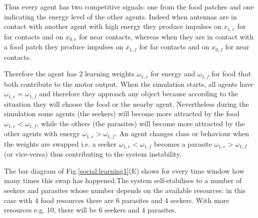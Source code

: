 Thus every agent has two competitive signals:
one from the food patches and one indicating the energy level of the other agents.
Indeed when antennas are in contact with another agent with high energy they produce
impulses on $x_{1,e}$ for far contacts and on $x_{0,e}$ for near contacts,
whereas when they are in contact with a food patch they produce impulses on $x_{1,f}$
for far contacts and on $x_{0,f}$ for near contacts.

Therefore the agent has 2 learning weights $\omega_{1,e}$ for energy and $\omega_{1,f}$
for food that both contribute to the motor output. When the simulation starts,
all agents have $\omega_{1,e}=\omega_{1,f}$ and therefore they approach any object because
according to the situation they will choose the food or the nearby agent.
Nevertheless during the simulation some agents (the seekers) will become more
attracted by the food  $\omega_{1,e}<\omega_{1,f}$, while the others (the parasites)
will become more attracted by the other agents with energy $\omega_{1,e}>\omega_{1,f}$.
An agent changes class or behaviour when the weights are swapped 
i.e. a seeker $\omega_{1,e}<\omega_{1,f}$ becomes a parasite $\omega_{1,e}>\omega_{1,f}$
(or vice-versa) thus contributing to the system instability.

The bar diagram of Fig.\ref{social:learning1}(E) shows for every time window how
many times this swap has happened.The system self-stabilises to a number of seekers
and parasites whose number depends on the available resources:
in this case with 4 food resources there are 6 parasites and 4 seekers.
With more resources e.g. 10, there will be 6 seekers and 4 parasites.

